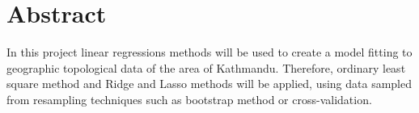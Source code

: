 \section{Abstract} \label{section:Abstract}
In this project linear regressions methods will be used to create a model fitting to geographic topological data of the area of Kathmandu. Therefore, ordinary least square method and Ridge and Lasso methods will be applied, using data sampled from resampling techniques such as bootstrap method or cross-validation. 